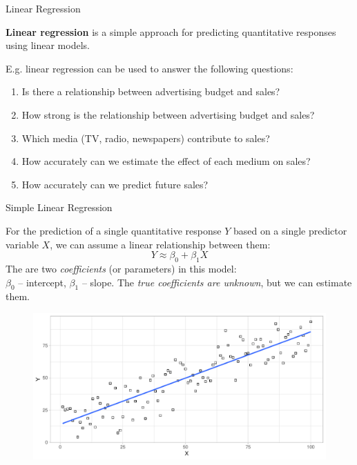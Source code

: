 \begin{frame}{Linear Regression}
    
    \textbf{Linear regression} is a simple approach for predicting quantitative responses using linear models.
    
    E.g. linear regression can be used to answer the following questions:
    {\small
    \begin{enumerate}
        \item Is there a relationship between advertising budget and sales?
        \item How strong is the relationship between advertising budget and sales?
        \item Which media (TV, radio, newspapers) contribute to sales?
        \item How accurately can we estimate the effect of each medium on sales?
        \item How accurately can we predict future sales?
    \end{enumerate}}
    
\end{frame}

\begin{frame}{Simple Linear Regression}
    
    For the prediction of a single quantitative response $Y$ based on a single predictor variable $X$, we can assume a linear relationship between them:
    \begin{equation}
    Y \approx \beta_0 + \beta_1 X
    \end{equation}  
    The are two \emph{coefficients} (or parameters) in this model:\\
    $\beta_0$ -- intercept, $\beta_1$ -- slope. The \emph{true coefficients are unknown}, but we can estimate them.

    \begin{figure}
        \includegraphics[width=0.7\linewidth]{R/plots/linear_regression}
    \end{figure}

\end{frame}

